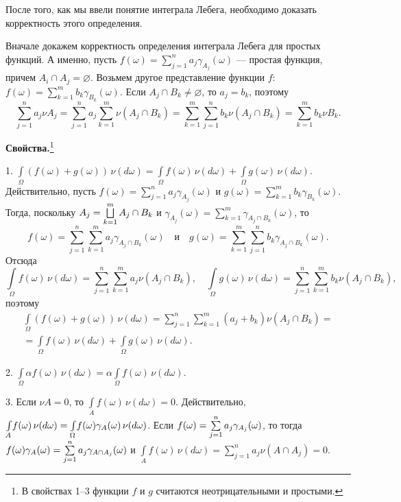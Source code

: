 \documentclass[12pt,titlepage]{article}
\newcommand{\svoy}{\vspace{5pt}\noindent\textbf{Свойства.}}
\theoremstyle{definition}
\newcommand*{\p}[1]{#1\nobreak\discretionary{}{\hbox{$\mathsurround=0pt #1$}}{}}
\begin{document}
После того, как мы ввели понятие интеграла Лебега, необходимо
доказать корректность этого определения.

Вначале докажем корректность определения интеграла Лебега для
простых функций. А именно, пусть $f(\omega)=\sum\limits_{j=1}^n
a_j\gamma_{A_j}(\omega)$ --- простая функция, причем $A_i\cap
A_j=\varnothing$. Возьмем другое представление функции $f$:
$f(\omega)=\sum\limits_{k=1}^m b_k\gamma_{B_k}(\omega)$. Если
$A_j\cap B_k\neq\varnothing$, то $a_j=b_k$, поэтому
$$\sum\limits_{j=1}^n a_j
\nu A_j=\sum\limits_{j=1}^n a_j\sum\limits_{k=1}^m \nu(A_j\cap
B_k)=\sum\limits_{k=1}^m\sum\limits_{j=1}^n b_k\nu(A_j\cap
B_k)=\sum\limits_{k=1}^m b_k\nu B_k.$$

\svoy\footnote{В свойствах 1--3 функции $f$ и $g$ считаются
неотрицательными и простыми.}

1. $\int\limits_\Omega\! (f(\omega)+g(\omega))\,\nu(d\omega)=
\int\limits_\Omega\! f(\omega)\,\nu(d\omega)+ \int\limits_\Omega\!
g(\omega)\,\nu(d\omega)$. Действительно, пусть
$f(\omega)=\sum\limits_{j=1}^n a_j\gamma_{A_j}(\omega)$ и
$g(\omega)=\sum\limits_{k=1}^m b_k\gamma_{B_k}(\omega)$. Тогда,
поскольку $A_j\p=\bigsqcup\limits_{k=1}^m A_j\cap B_k$ и
$\gamma_{A_j}(\omega)=\sum\limits_{k=1}^m \gamma_{A_j\cap
B_k}(\omega)$, то
$$f(\omega)=\sum\limits_{j=1}^n\sum\limits_{k=1}^m a_j\gamma_{A_j
\cap B_k}(\omega)\quad\text{и}\quad
g(\omega)=\sum\limits_{k=1}^m\sum\limits_{j=1}^n b_k\gamma_{A_j \cap
B_k}(\omega).$$ Отсюда $$\int\limits_\Omega\!
f(\omega)\,\nu(d\omega)=\sum\limits_{j=1}^n\sum\limits_{k=1}^m
a_j\nu(A_j\cap B_k),\quad \int\limits_\Omega\!
g(\omega)\,\nu(d\omega)=\sum\limits_{j=1}^n\sum\limits_{k=1}^m
b_k\nu(A_j\cap B_k),$$ поэтому
\begin{multline*}
\int\limits_\Omega\!
(f(\omega)+g(\omega))\,\nu(d\omega)=\sum\limits_{j=1}^n\sum\limits_{k=1}^m
(a_j+b_k)\nu(A_j\cap B_k)= \\ =\int\limits_\Omega\!
f(\omega)\,\nu(d\omega)+ \int\limits_\Omega\!
g(\omega)\,\nu(d\omega).
\end{multline*}

2. $\int\limits_\Omega\!\alpha
f(\omega)\,\nu(d\omega)=\alpha\int\limits_\Omega\!
f(\omega)\,\nu(d\omega)$.

3. Если $\nu A=0$, то $\int\limits_A\! f(\omega)\,\nu(d\omega)=0$.
Действительно, $\int\limits_A\!
f(\omega)\,\nu(d\omega)\p=\int\limits_\Omega\!
f(\omega)\gamma_A(\omega)\,\nu(d\omega)$. Если
$f(\omega)\p=\sum\limits_{j=1}^n a_j\gamma_{A_j}(\omega)$, то тогда
$f(\omega)\gamma_A(\omega)\p=\sum\limits_{j=1}^n a_j\gamma_{A\cap
A_j}(\omega)$ и $\int\limits_A\!
f(\omega)\,\nu(d\omega)=\sum\limits_{j=1}^n a_j\nu(A\cap A_j)=0$.
\end{document}
